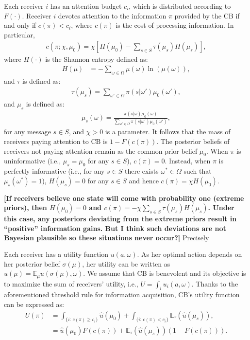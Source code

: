 \documentclass[12pt,a4paper]{article}
\begin{document}
Each receiver $i$ has an attention budget $c_i$, which is distributed according to $F(\cdot)$. Receiver $i$ devotes attention to the information $\pi$ provided by the CB if and only if $c(\pi)<c_i$, where $c(\pi)$ is the cost of processing information. In particular,
\begin{align}
    c(\pi; \chi, \mu_0) = \chi\left[H(\mu_0)-\sum_{s \in S}\tau(\mu_s) H(\mu_s)\right],
\end{align}
where $H(\cdot)$ is the Shannon entropy defined as:
\begin{align}
    H(\mu) & = -\sum_{\omega\in\Omega}\mu(\omega)\ln(\mu(\omega)),
\end{align}
and $\tau$ is defined as:
\begin{align}
    \tau(\mu_s) = \sum_{\omega'\in\Omega}\pi(s|\omega')\mu_0(\omega'),
\end{align}
and $\mu_s$ is defined as:
\begin{align}
    \mu_s(\omega) = \frac{\pi(s|\omega)\mu_0(\omega)}{\sum_{\omega'\in\Omega}\pi(s|\omega')\mu_0(\omega')},
\end{align}
for any message $s\in S$, and $\chi>0$ is a parameter. It follows that the mass of receivers paying attention to CB is $1-F(c(\pi))$. The posterior beliefs of receivers not paying attention remain as the common prior belief $\mu_0$. When $\pi$ is uninformative (i.e., $\mu_s = \mu_0$ for any $s\in S$), $c(\pi)=0$. Instead, when $\pi$ is perfectly informative (i.e., for any $s \in S$ there exists $\omega^* \in \Omega$ such that $\mu_s(\omega^*)=1$), $H(\mu_s)=0$ for any $s\in S$ and hence $c(\pi)=\chi H(\mu_0)$.

\textbf{[If receivers believe one state will come with probability one (extreme priors), then $H(\mu_0)=0$ and $c(\pi)=-\chi\sum_{s \in S}\tau(\mu_s)H(\mu_s)$. Under this case, any posteriors deviating from the extreme priors result in ``positive'' information gains. But I think such deviations are not Bayesian plausible so these situations never occur?] }\underline{ Precisely}

Each receiver has a utility function $u(a,\omega)$. As her optimal action depends on her posterior belief $\sigma(\mu)$, her utility can be written as $\hat{u}(\mu)=\mathbb{E}_\mu u(\sigma(\mu),\omega)$. We assume that CB is benevolent and its objective is to maximize the sum of receivers' utility, i.e., $U = \int_i u_i(a,\omega)$. Thanks to the aforementioned threshold rule for information acquisition, CB's utility function can be expressed as:
\begin{align}
   U(\pi) & = \int_{\{i:\, c(\pi) \geq c_i\}} \hat{u}(\mu_0) + \int_{\{i:\, c(\pi) < c_i\}} \mathbb{E}_\tau(\hat{u}(\mu_s)), \\
   & = \hat{u}(\mu_0)F(c(\pi)) + \mathbb{E}_\tau(\hat{u}(\mu_s))(1-F(c(\pi))).
\end{align}
\end{document}

